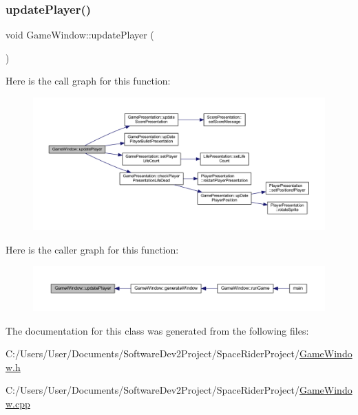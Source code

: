 \subsubsection{\texorpdfstring{update\+Player()}{updatePlayer()}}
{\footnotesize\ttfamily void Game\+Window\+::update\+Player (\begin{DoxyParamCaption}{ }\end{DoxyParamCaption})}

Here is the call graph for this function\+:\nopagebreak
\begin{figure}[H]
\begin{center}
\leavevmode
\includegraphics[width=350pt]{class_game_window_a9ebcf385e9ed9fd52f1d8b2c88f9c091_cgraph}
\end{center}
\end{figure}
Here is the caller graph for this function\+:\nopagebreak
\begin{figure}[H]
\begin{center}
\leavevmode
\includegraphics[width=350pt]{class_game_window_a9ebcf385e9ed9fd52f1d8b2c88f9c091_icgraph}
\end{center}
\end{figure}


The documentation for this class was generated from the following files\+:\begin{DoxyCompactItemize}
\item 
C\+:/\+Users/\+User/\+Documents/\+Software\+Dev2\+Project/\+Space\+Rider\+Project/\hyperlink{_game_window_8h}{Game\+Window.\+h}\item 
C\+:/\+Users/\+User/\+Documents/\+Software\+Dev2\+Project/\+Space\+Rider\+Project/\hyperlink{_game_window_8cpp}{Game\+Window.\+cpp}\end{DoxyCompactItemize}
